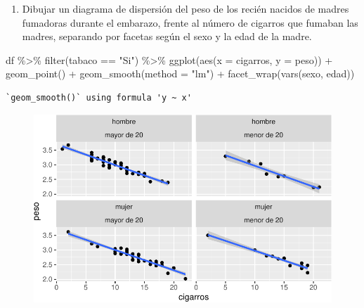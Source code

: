 \documentclass[
  a4paper,
]{scrreport}
\newenvironment{Shaded}{\begin{snugshade}}{\end{snugshade}}
\newcommand{\AttributeTok}[1]{\textcolor[rgb]{0.40,0.45,0.13}{#1}}
\newcommand{\FunctionTok}[1]{\textcolor[rgb]{0.28,0.35,0.67}{#1}}
\newcommand{\NormalTok}[1]{\textcolor[rgb]{0.00,0.23,0.31}{#1}}
\newcommand{\SpecialCharTok}[1]{\textcolor[rgb]{0.37,0.37,0.37}{#1}}
\newcommand{\StringTok}[1]{\textcolor[rgb]{0.13,0.47,0.30}{#1}}
\providecommand{\tightlist}{%
  \setlength{\itemsep}{0pt}\setlength{\parskip}{0pt}}\usepackage{longtable,booktabs,array}
\theoremstyle{definition}
\theoremstyle{definition}
\theoremstyle{remark}
\begin{document}
\begin{enumerate}
\def\labelenumi{\alph{enumi}.}
\setcounter{enumi}{7}
\tightlist
\item
  Dibujar un diagrama de dispersión del peso de los recién nacidos de
  madres fumadoras durante el embarazo, frente al número de cigarros que
  fumaban las madres, separando por facetas según el sexo y la edad de
  la madre.
\end{enumerate}

\begin{tcolorbox}[enhanced jigsaw, left=2mm, colframe=quarto-callout-note-color-frame, breakable, colback=white, title=\textcolor{quarto-callout-note-color}{\faInfo}\hspace{0.5em}{Solución}, toprule=.15mm, arc=.35mm, leftrule=.75mm, colbacktitle=quarto-callout-note-color!10!white, opacityback=0, coltitle=black, opacitybacktitle=0.6, rightrule=.15mm, bottomrule=.15mm, bottomtitle=1mm, toptitle=1mm, titlerule=0mm]

\begin{Shaded}
\begin{Highlighting}[]
\NormalTok{df }\SpecialCharTok{\%\textgreater{}\%} 
    \FunctionTok{filter}\NormalTok{(tabaco }\SpecialCharTok{==} \StringTok{"Si"}\NormalTok{) }\SpecialCharTok{\%\textgreater{}\%}
    \FunctionTok{ggplot}\NormalTok{(}\FunctionTok{aes}\NormalTok{(}\AttributeTok{x =}\NormalTok{ cigarros, }\AttributeTok{y =}\NormalTok{ peso)) }\SpecialCharTok{+}
        \FunctionTok{geom\_point}\NormalTok{() }\SpecialCharTok{+}
        \FunctionTok{geom\_smooth}\NormalTok{(}\AttributeTok{method =} \StringTok{"lm"}\NormalTok{) }\SpecialCharTok{+}
        \FunctionTok{facet\_wrap}\NormalTok{(}\FunctionTok{vars}\NormalTok{(sexo, edad))}
\end{Highlighting}
\end{Shaded}

\begin{verbatim}
`geom_smooth()` using formula 'y ~ x'
\end{verbatim}

\begin{figure}[H]

{\centering \includegraphics{./07-graficos_files/figure-pdf/unnamed-chunk-41-1.pdf}

}

\end{figure}

\end{tcolorbox}
\end{document}
